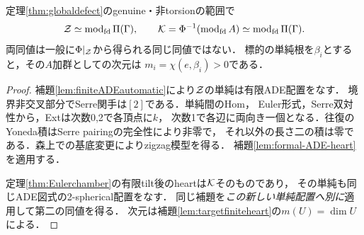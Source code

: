 \begin{theorem}[二つの境界外heartのabel模型]\label{thm:ADE-abelian}
定理\ref{thm:globaldefect}のgenuine・非torsionの範囲で
\[
 \mathcal Z\simeq\operatorname{mod}_{\rm fd}\Pi(\Gamma),\qquad
 \mathcal K=\Phi^{-1}(\operatorname{mod}_{\rm fd}A)
       \simeq\operatorname{mod}_{\rm fd}\Pi(\Gamma).
\]
両同値は一般に$\Phi|_{\mathcal Z}$から得られる同じ同値ではない．
標的の単純根を$\beta_i$とすると，その$A$加群としての次元は
$m_i=\chi(e,\beta_i)>0$である．
\end{theorem}
\begin{proof}
補題\ref{lem:finiteADEautomatic}により$\mathcal Z$の単純は有限ADE配置をなす．
境界非交叉部分でSerre関手は$[2]$である．単純間のHom，
Euler形式，Serre双対性から，Extは次数0,2で各頂点に$k$，
次数1で各辺に両向き一個となる．往復のYoneda積はSerre pairingの完全性により非零で，
それ以外の長さ二の積は零である．森上での基底変更によりzigzag模型を得る．
補題\ref{lem:formal-ADE-heart}を適用する．

定理\ref{thm:Eulerchamber}の有限tilt後のheartは$\mathcal K$そのものであり，
その単純も同じADE図式の2-spherical配置をなす．
同じ補題を\emph{この新しい単純配置へ別に}適用して第二の同値を得る．
次元は補題\ref{lem:targetfiniteheart}の$m(U)=\dim U$による．
\end{proof}

